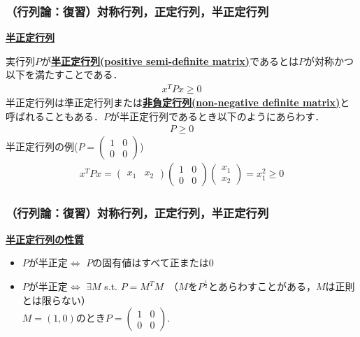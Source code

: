 \begin{frame}[t]
\frametitle{（行列論：復習）対称行列，正定行列，半正定行列}

\noindent
{\bf \underline{半正定行列}}

実行列$P$が{\bf \underline{半正定行列(positive semi-definite matrix)}}であるとは$P$が対称かつ以下を満たすことである．
\begin{eqnarray}
	x^T P x \geq 0
\end{eqnarray}
半正定行列は準正定行列または{\bf \underline{非負定行列(non-negative definite matrix)}}と呼ばれることもある．$P$が半正定行列であるとき以下のようにあらわす．
\begin{eqnarray}
	P \geq 0
\end{eqnarray}
半正定行列の例($ P = \left(\begin{array}{cc} 1 & 0 \\ 0 & 0 \end{array}\right) $)
\begin{eqnarray}
	x^T P x = 
	\left(\begin{array}{cc} x_1 & x_2 \end{array}\right)
	\left(\begin{array}{cc} 1 & 0 \\ 0 & 0 \end{array}\right)
	\left(\begin{array}{c}  x_1 \\ x_2 \end{array}\right)
	=
	x_1^2 \geq 0
\end{eqnarray}
\end{frame}



\begin{frame}[t]
\frametitle{（行列論：復習）対称行列，正定行列，半正定行列}

\noindent
{\bf \underline{半正定行列の性質}}
\begin{itemize}
  \item $P$が半正定$\Leftrightarrow$ $P$の固有値はすべて正または$0$
  \item $P$が半正定$\Leftrightarrow$ $\exists M$ s.t. $P = M^T M$　（$M$を$P^{\frac{1}{2}}$とあらわすことがある，$M$は正則とは限らない）\\
  $M=(1,0)$のとき$P=\left(\begin{array}{cc} 1 & 0 \\ 0 & 0 \end{array}\right)$.
\end{itemize}
\end{frame}


